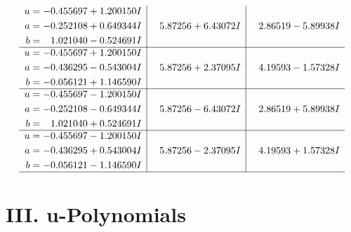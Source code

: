 \documentclass[1p]{elsarticle_modified}
\theoremstyle{definition}
\begin{document}
$$\begin{array}{c|c|c}
\begin{aligned}
u &= -0.455697 + 1.200150 I \\
a &= -0.252108 + 0.649344 I \\
b &= \phantom{-}1.021040 - 0.524691 I\end{aligned}
 & \phantom{-}5.87256 + 6.43072 I & \phantom{-}2.86519 - 5.89938 I \\ \hline\begin{aligned}
u &= -0.455697 + 1.200150 I \\
a &= -0.436295 - 0.543004 I \\
b &= -0.056121 + 1.146590 I\end{aligned}
 & \phantom{-}5.87256 + 2.37095 I & \phantom{-}4.19593 - 1.57328 I \\ \hline\begin{aligned}
u &= -0.455697 - 1.200150 I \\
a &= -0.252108 - 0.649344 I \\
b &= \phantom{-}1.021040 + 0.524691 I\end{aligned}
 & \phantom{-}5.87256 - 6.43072 I & \phantom{-}2.86519 + 5.89938 I \\ \hline\begin{aligned}
u &= -0.455697 - 1.200150 I \\
a &= -0.436295 + 0.543004 I \\
b &= -0.056121 - 1.146590 I\end{aligned}
 & \phantom{-}5.87256 - 2.37095 I & \phantom{-}4.19593 + 1.57328 I\\
 \hline 
 \end{array}$$\newpage
\newpage\renewcommand{\arraystretch}{1}
\centering \section*{ III. u-Polynomials}
\end{document}
